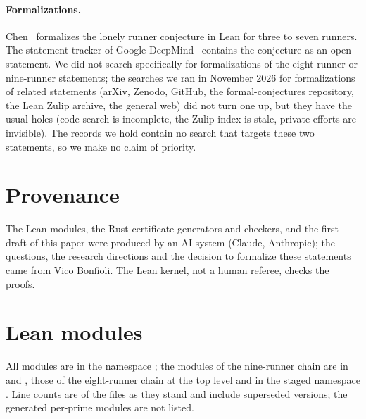 \documentclass[11pt]{article}
\theoremstyle{remark}
\begin{document}
\paragraph{Formalizations.} Chen~\cite{Chen} formalizes the lonely runner conjecture in Lean for three to seven runners. The statement tracker of Google DeepMind~\cite{FC} contains the conjecture as an open statement. We did not search specifically for formalizations of the eight-runner or nine-runner statements; the searches we ran in November 2026 for formalizations of related statements (arXiv, Zenodo, GitHub, the formal-conjectures repository, the Lean Zulip archive, the general web) did not turn one up, but they have the usual holes (code search is incomplete, the Zulip index is stale, private efforts are invisible). The records we hold contain no search that targets these two statements, so we make no claim of priority.

\section{Provenance}\label{sec:prov}

The Lean modules, the Rust certificate generators and checkers, and the first draft of this paper were produced by an AI system (Claude, Anthropic); the questions, the research directions and the decision to formalize these statements came from Vico Bonfioli. The Lean kernel, not a human referee, checks the proofs.

\appendix
\section{Lean modules}\label{app:modules}
All modules are in the namespace ; the modules of the nine-runner chain are in  and , those of the eight-runner chain at the top level and in the staged namespace . Line counts are of the files as they stand and include superseded versions; the generated per-prime modules are not listed.
\end{document}
